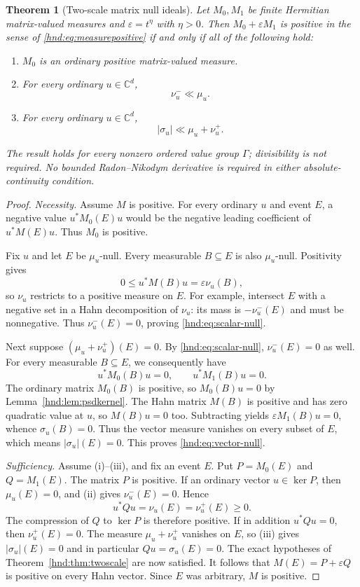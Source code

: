 \documentclass[11pt,oneside]{article}
\newtheorem{theorem}{Theorem}[section]
\theoremstyle{definition}
\theoremstyle{remark}
\newcommand{\C}{\mathbb C}
\newcommand{\eps}{\varepsilon}
\begin{document}
\begin{theorem}[Two-scale matrix null ideals]\label{hnd:thm:measure}
Let $M_0,M_1$ be finite Hermitian matrix-valued measures and
$\eps=t^\eta$ with $\eta>0$. Then $M_0+\eps M_1$ is positive in the
sense of \eqref{hnd:eq:measurepositive} if and only if all of the following
hold:
\begin{enumerate}[label=(\roman*)]
\item $M_0$ is an ordinary positive matrix-valued measure.
\item For every ordinary $u\in\C^d$,
\begin{equation}\label{hnd:eq:scalar-null}
 \nu_u^-\ll\mu_u.
\end{equation}
\item For every ordinary $u\in\C^d$,
\begin{equation}\label{hnd:eq:vector-null}
 |\sigma_u|\ll\mu_u+\nu_u^+.
\end{equation}
\end{enumerate}
The result holds for every nonzero ordered value group $\Gamma$;
divisibility is not required. No bounded Radon--Nikodym derivative is
required in either absolute-continuity condition.
\end{theorem}
\begin{proof}
\emph{Necessity.}
Assume $M$ is positive. For every ordinary $u$ and event $E$, a negative
value $u^*M_0(E)u$ would be the negative leading coefficient of
$u^*M(E)u$. Thus $M_0$ is positive.

Fix $u$ and let $E$ be $\mu_u$-null. Every measurable $B\subseteq E$
is also $\mu_u$-null. Positivity gives
\[
 0\le u^*M(B)u=\eps\nu_u(B),
\]
so $\nu_u$ restricts to a positive measure on $E$.
For example, intersect $E$ with a negative set in a Hahn decomposition
of $\nu_u$: its mass is $-\nu_u^-(E)$ and must be nonnegative.
Thus $\nu_u^-(E)=0$, proving \eqref{hnd:eq:scalar-null}.

Next suppose $(\mu_u+\nu_u^+)(E)=0$. By
\eqref{hnd:eq:scalar-null}, $\nu_u^-(E)=0$ as well.
For every measurable $B\subseteq E$, we consequently have
\[
 u^*M_0(B)u=0,\qquad u^*M_1(B)u=0.
\]
The ordinary matrix $M_0(B)$ is positive, so
$M_0(B)u=0$ by Lemma~\ref{hnd:lem:psdkernel}. The Hahn matrix $M(B)$ is
positive and has zero quadratic value at $u$, so $M(B)u=0$ too.
Subtracting yields $\eps M_1(B)u=0$, whence $\sigma_u(B)=0$.
Thus the vector measure vanishes on every subset of $E$, which means
$|\sigma_u|(E)=0$. This proves \eqref{hnd:eq:vector-null}.

\emph{Sufficiency.}
Assume (i)--(iii), and fix an event $E$. Put $P=M_0(E)$ and
$Q=M_1(E)$. The matrix $P$ is positive. If an ordinary vector
$u\in\ker P$, then $\mu_u(E)=0$, and (ii) gives
$\nu_u^-(E)=0$. Hence
\[
 u^*Qu=\nu_u(E)=\nu_u^+(E)\ge0.
\]
The compression of $Q$ to $\ker P$ is therefore positive.
If in addition $u^*Qu=0$, then $\nu_u^+(E)=0$.
The measure $\mu_u+\nu_u^+$ vanishes on $E$, so (iii) gives
$|\sigma_u|(E)=0$ and in particular $Qu=\sigma_u(E)=0$.
The exact hypotheses of Theorem~\ref{hnd:thm:twoscale} are now satisfied.
It follows that $M(E)=P+\eps Q$ is positive on every Hahn vector.
Since $E$ was arbitrary, $M$ is positive.
\end{proof}
\end{document}
